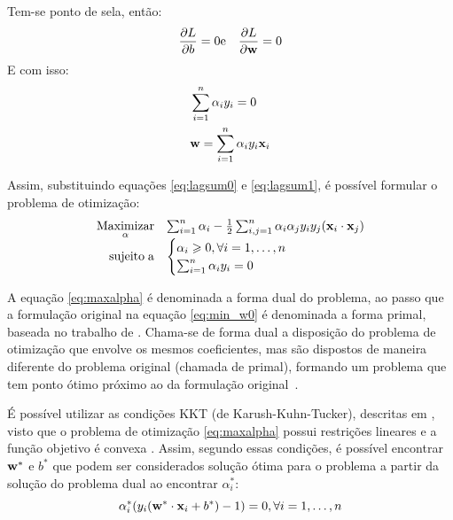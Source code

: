 
Tem-se ponto de sela, então:
\begin{eqnarray}\label{eq:sela}
  \frac{\partial{L}}{\partial{b}} = 0 & \text{e} & \frac{\partial{L}}{\partial{\mathbf{w}}} = 0
\end{eqnarray}
E com isso:
\begin{eqnarray}
&  \label{eq:lagsum0}  \sum_{i=1}^n{\alpha_i y_i} = 0 \\
&  \label{eq:lagsum1}  \mathbf{w} = \sum_{i=1}^n{\alpha_i y_i\mathbf{x}_i}
\end{eqnarray}

Assim, substituindo equações \ref{eq:lagsum0} e \ref{eq:lagsum1}, é possível formular o problema de otimização:
\begin{eqnarray}\label{eq:maxalpha}
\begin{array}{rl}
   \underset{\alpha}{\operatorname{Maximizar}}
   & \sum_{i=1}^n{\alpha_i - \frac{1}{2}}
                            \sum_{i,j=1}^n{\alpha_i\alpha_j y_i y_j(\mathbf{x}_i\cdot\mathbf{x}_j)} \\
\operatorname{sujeito\;a} &
  \begin{cases}
    \alpha_i \geqslant 0, \forall{i} = 1,\dotsc,n \\
    \sum_{i=1}^n{\alpha_i y_i} = 0
  \end{cases}
\end{array}
\end{eqnarray}

A equação \ref{eq:maxalpha} é denominada a forma dual do problema, ao passo que a formulação original na equação \ref{eq:min_w0} é denominada a forma primal, baseada no trabalho de . Chama-se de forma dual a disposição do problema de otimização que envolve os mesmos coeficientes, mas são dispostos de maneira diferente do problema original (chamada de primal), formando um problema que tem ponto ótimo próximo ao da formulação original~\cite{puccini1990introducao}.


É possível utilizar as condições KKT (de Karush-Kuhn-Tucker), descritas em , visto que o problema de otimização \ref{eq:maxalpha} possui restrições lineares e a função objetivo é convexa \cite{burges1998tutorial}. Assim, segundo essas condições, é possível encontrar $\mathbf{w^*}$ e $b^*$ que podem ser considerados solução ótima para o problema a partir da solução do problema dual ao encontrar $\alpha_i^*$:
\begin{equation}\label{eq:dualalpha}
  \alpha_i^*(y_i(\mathbf{w^*}\cdot\mathbf{x}_i+b^*) - 1) = 0, \forall{i}=1,\dotsc,n
\end{equation}

